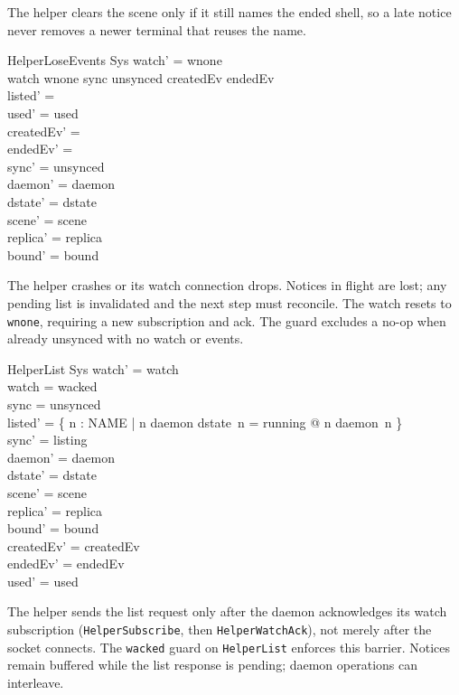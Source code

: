 \documentclass[a4paper,10pt,fleqn]{article}
\begin{document}
The helper clears the scene only if it still names the ended shell, so
a late notice never removes a newer terminal that reuses the name.

\begin{schema}{HelperLoseEvents}
  \Delta Sys
\where
  watch' = wnone \\
  watch \neq wnone \lor sync \neq unsynced \lor
    createdEv \neq \emptyset \lor endedEv \neq \emptyset \\
  listed' = \emptyset \\
  used' = used \\
  createdEv' = \emptyset \\
  endedEv' = \emptyset \\
  sync' = unsynced \\
  daemon' = daemon \\
  dstate' = dstate \\
  scene' = scene \\
  replica' = replica \\
  bound' = bound
\end{schema}

The helper crashes or its watch connection drops.  Notices in flight are
lost; any pending list is invalidated and the next step must reconcile.
The watch resets to \texttt{wnone}, requiring a new subscription and ack.
The guard excludes a no-op when already unsynced with no watch or events.

\begin{schema}{HelperList}
  \Delta Sys
\where
  watch' = watch \\
  watch = wacked \\
  sync = unsynced \\
  listed' = \{ n : NAME | n \in \dom daemon \land dstate~n = running
    @ n \mapsto daemon~n \} \\
  sync' = listing \\
  daemon' = daemon \\
  dstate' = dstate \\
  scene' = scene \\
  replica' = replica \\
  bound' = bound \\
  createdEv' = createdEv \\
  endedEv' = endedEv \\
  used' = used
\end{schema}

The helper sends the list request only after the daemon acknowledges its
watch subscription (\texttt{HelperSubscribe}, then \texttt{HelperWatchAck}),
not merely after the socket connects. The \texttt{wacked} guard on
\texttt{HelperList} enforces this barrier. Notices remain buffered
while the list response is pending; daemon operations can interleave.
\end{document}
